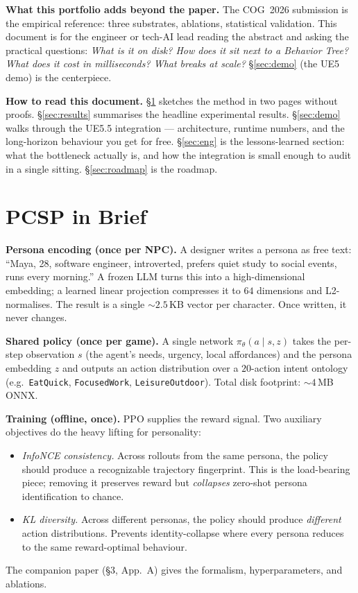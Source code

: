 \documentclass[11pt]{article}
\newcommand{\PCSP}{PCSP}
\begin{document}
\noindent\textbf{What this portfolio adds beyond the paper.}
The COG~2026 submission is the empirical reference: three substrates,
ablations, statistical validation. This document is for the engineer
or tech-AI lead reading the abstract and asking the practical
questions: \emph{What is it on disk? How does it sit next to a
Behavior Tree? What does it cost in milliseconds? What breaks at
scale?} \S\ref{sec:demo} (the UE5 demo) is the centerpiece.

\noindent\textbf{How to read this document.}
\S\ref{sec:method} sketches the method in two pages without
proofs. \S\ref{sec:results} summarises the headline experimental
results. \S\ref{sec:demo} walks through the UE5.5 integration ---
architecture, runtime numbers, and the long-horizon behaviour you
get for free. \S\ref{sec:eng} is the lessons-learned section: what
the bottleneck actually is, and how the integration is small enough
to audit in a single sitting. \S\ref{sec:roadmap} is the roadmap.

\section{\PCSP{} in Brief}
\label{sec:method}

\noindent\textbf{Persona encoding (once per NPC).}
A designer writes a persona as free text: ``Maya, 28, software
engineer, introverted, prefers quiet study to social events, runs
every morning.'' A frozen LLM turns this into a high-dimensional
embedding; a learned linear projection compresses it to $64$
dimensions and L2-normalises. The result is a single
$\sim\!2.5\,$KB vector per character. Once written, it never changes.

\noindent\textbf{Shared policy (once per game).}
A single network $\pi_\theta(a \mid s, z)$ takes the per-step
observation $s$ (the agent's needs, urgency, local affordances) and
the persona embedding $z$ and outputs an action distribution over a
$20$-action intent ontology (e.g.\ \texttt{EatQuick},
\texttt{FocusedWork}, \texttt{LeisureOutdoor}). Total disk footprint:
$\sim\!4$\,MB ONNX.

\noindent\textbf{Training (offline, once).}
PPO supplies the reward signal. Two auxiliary objectives do the heavy
lifting for personality:
\begin{itemize}[leftmargin=*,nosep]
\item \emph{InfoNCE consistency.} Across rollouts from the same
persona, the policy should produce a recognizable trajectory
fingerprint. This is the load-bearing piece; removing it preserves
reward but \emph{collapses} zero-shot persona identification to
chance.
\item \emph{KL diversity.} Across different personas, the policy
should produce \emph{different} action distributions. Prevents
identity-collapse where every persona reduces to the same
reward-optimal behaviour.
\end{itemize}
The companion paper (\S3, App.~A) gives the formalism, hyperparameters,
and ablations.
\end{document}
